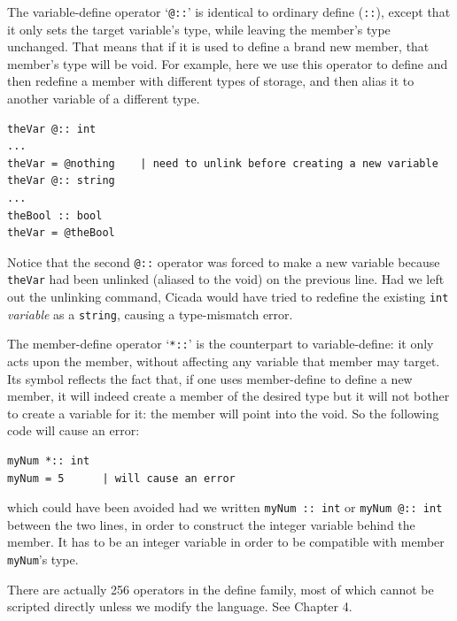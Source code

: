 \documentclass{article}
\newenvironment{code}{
       \begin{list}{}{
               \setlength{\leftmargin}{.4in}
               \setlength{\rightmargin}{0in}
               \setlength{\topsep}{.2in}
       }
       \small
       \item[] }
       { \end{list}   }
\begin{document}
The variable-define operator `\texttt{@::}' is identical to ordinary define (\texttt{::}), except that it only sets the target variable's type, while leaving the member's type unchanged.  That means that if it is used to define a brand new member, that member's type will be void.  For example, here we use this operator to define and then redefine a member with different types of storage, and then alias it to another variable of a different type.

\begin{code} \begin{verbatim}
theVar @:: int
...
theVar = @nothing    | need to unlink before creating a new variable
theVar @:: string
...
theBool :: bool
theVar = @theBool
\end{verbatim} \end{code}

\noindent Notice that the second \verb#@::# operator was forced to make a new variable because \verb#theVar# had been unlinked (aliased to the void) on the previous line.  Had we left out the unlinking command, Cicada would have tried to redefine the existing \verb#int# \emph{variable} as a \verb#string#, causing a type-mismatch error.

The member-define operator `\texttt{*::}' is the counterpart to variable-define:  it only acts upon the member, without affecting any variable that member may target.  Its symbol reflects the fact that, if one uses member-define to define a new member, it will indeed create a member of the desired type but it will not bother to create a variable for it:  the member will point into the void.  So the following code will cause an error:

\begin{code} \begin{verbatim}
myNum *:: int
myNum = 5      | will cause an error
\end{verbatim} \end{code}

\noindent which could have been avoided had we written \verb#myNum :: int# or \verb#myNum @:: int# between the two lines, in order to construct the integer variable behind the member.  It has to be an integer variable in order to be compatible with member \verb#myNum#'s type.

There are actually 256 operators in the define family, most of which cannot be scripted directly unless we modify the language.  See Chapter 4.\\
\end{document}
